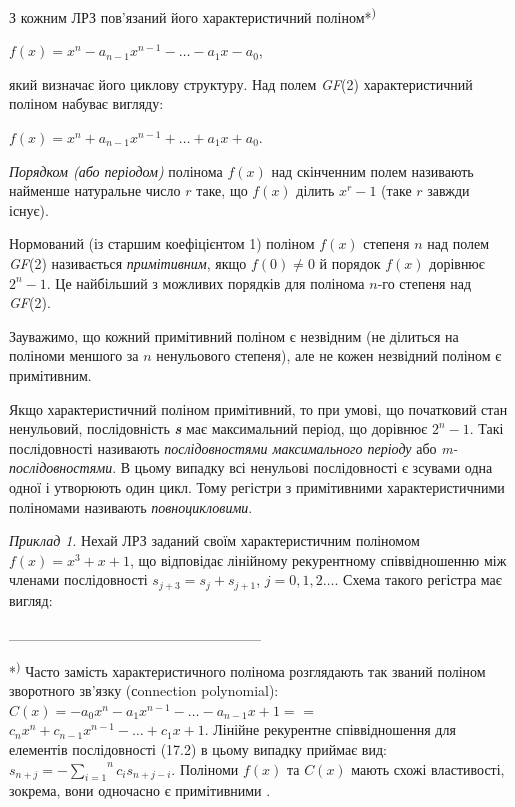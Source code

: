 \bigskip


\bigskip

З кожним ЛРЗ пов’язаний його характеристичний поліном*\textsuperscript{)}

{\centering
 ${f(x)=x^{{n}}-a_{{n-1}}x^{{n-1}}-\dots-a_{{1}}x-a_{{0}}}$,
\par}

який визначає його циклову структуру. Над полем \textit{GF}(2) характеристичний
поліном набуває вигляду:

{\centering
 ${f(x)=x^{{n}}+a_{{n-1}}x^{{n-1}}+\dots+a_{{1}}x+a_{{0}}}$.
\par}

\textit{Порядком (або періодом)} полінома  ${f(x)}$  над скінченним полем
називають найменше натуральне число  ${r}$ таке, що  ${f(x)}$ ділить 
${x^{{r}}-1}$ (таке  ${r}$ завжди існує).

Нормований (із старшим коефіцієнтом 1) поліном  ${f(x)}$ степеня  ${n}$ над
полем \textit{GF}(2) називається \textit{примітивним}, якщо  ${f(0)\neq 0}$ й
порядок  ${f(x)}$ дорівнює  ${2^{{n}}-1}$. Це найбільший з можливих порядків
для полінома  ${n}${}-го степеня над \textit{GF}(2). $ $

Зауважимо, що кожний примітивний поліном є незвідним (не ділиться на поліноми
меншого за  ${n}$ ненульового степеня), але не кожен незвідний поліном є
примітивним.

Якщо характеристичний поліном примітивний, то при умові, що початковий стан
ненульовий, послідовність \textbf{\textit{s}} має максимальний період, що
дорівнює  ${2^{{n}}-1}$. Такі послідовності називають \textit{послідовностями
максимального періоду }або\textit{ }\textit{m}\textit{{}-послідовностями}. В
цьому випадку всі ненульові послідовності є зсувами одна одної і утворюють один
цикл. Тому регістри з примітивними характеристичними поліномами називають
\textit{повноцикловими}.\textbf{ }

\textit{Приклад 1}. Нехай ЛРЗ заданий своїм характеристичним поліномом 
${f(x)=x^{{3}}+x+1}$, що відповідає лінійному рекурентному співвідношенню між
членами послідовності  ${s_{{j+3}}=s_{{j}}+s_{{j+1}}}$,
${j=0,1,2\dots}$. Схема такого регістра має вигляд:


\bigskip

\_\_\_\_\_\_\_\_\_\_\_\_\_\_\_\_\_\_\_\_\_\_\_\_

*\textsuperscript{)} Часто замість характеристичного полінома розглядають так
званий поліном зворотного зв’язку (сonnection polynomial): 
${C(x)=-a_{{0}}x^{{n}}-a_{{1}}x^{{n-1}}-\dots-a_{{n-1}}x+1=}$
= ${c_{{n}}x^{{n}}+c_{{n-1}}x^{{n-1}}-\dots+c_{{1}}x+1}$.
Лінійне рекурентне співвідношення для елементів послідовності  (17.2) в цьому
випадку приймає вид:  ${s_{{n+j}}=-\overset{{n}}{\underset{{i=1}}{\sum
}}{c_{{i}}s_{{n+j-i}}}}$. Поліноми  ${f(x)}$ та  ${C(x)}$ мають схожі
властивості, зокрема, вони одночасно є примітивними .

